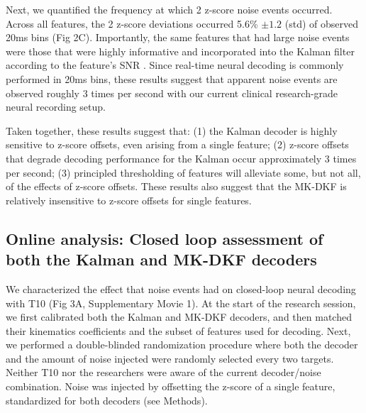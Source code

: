 Next, we quantified the frequency at which 2 z-score noise events occurred. Across all features, the 2 z-score deviations occurred 5.6\% $\pm 1.2$ (std) of observed 20ms bins (Fig 2C). Importantly, the same features that had large noise events were those that were highly informative and incorporated into the Kalman filter according to the feature's SNR \cite{Jarosiewicz2015, Bacher2015, Brandman2018}. Since real-time neural decoding is commonly performed in 20ms bins, these results suggest that apparent noise events are observed roughly 3 times per second with our current clinical research-grade neural recording setup. 

Taken together, these results suggest that: (1) the Kalman decoder is highly sensitive to z-score offsets, even arising from a single feature; (2) z-score offsets that degrade decoding performance for the Kalman occur approximately 3 times per second; (3) principled thresholding of features will alleviate some, but not all, of the effects of z-score offsets. These results also suggest that the MK-DKF is relatively insensitive to z-score offsets for single features. 

\subsection{Online analysis: Closed loop assessment of both the Kalman and MK-DKF decoders} 

We characterized the effect that noise events had on closed-loop neural decoding with T10 (Fig 3A, Supplementary Movie 1). At the start of the research session, we first calibrated both the Kalman and MK-DKF decoders, and then matched their kinematics coefficients and the subset of features used for decoding. Next, we performed a double-blinded randomization procedure where both the decoder and the amount of noise injected were randomly selected every two targets. Neither T10 nor the researchers were aware of the current decoder/noise combination. Noise was injected by offsetting the z-score of a single feature, standardized for both decoders (see Methods).


